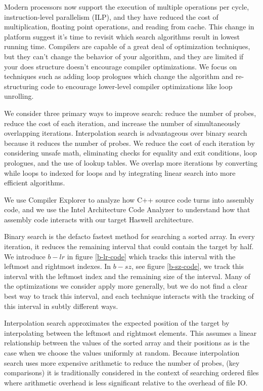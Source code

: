 \documentclass[twocolumn]{article}
\begin{document}
Modern processors now support the execution of multiple operations per cycle, instruction-level parallelism (ILP), and they have reduced the cost of multiplication, floating point operations, and reading from cache. This change in platform suggest it's time to revisit which search algorithms result in lowest running time. Compilers are capable of a great deal of optimization techniques, but they can't change the behavior of your algorithm, and they are limited if your does structure doesn't encourage compiler optimizations. We focus on techniques such as adding loop prologues which change the algorithm and re-structuring code to encourage lower-level compiler optimizations like loop unrolling.

We consider three primary ways to improve search: reduce the number of probes, reduce the cost of each iteration, and increase the number of simultaneously overlapping iterations. Interpolation search is advantageous over binary search because it reduces the number of probes. We reduce the cost of each iteration by considering unsafe math, eliminating checks for equality and exit conditions, loop prologues, and the use of lookup tables. We overlap more iterations by converting while loops to indexed for loops and by integrating linear search into more efficient algorithms.

We use Compiler Explorer to analyze how C++ source code turns into assembly code, and we use the Intel Architecture Code Analyzer to understand how that assembly code interacts with our target Haswell architecture.

Binary search is the defacto fastest method for searching a sorted array. In every iteration, it reduces the remaining interval that could contain the target by half. We introduce $b-lr$ in figure \ref{b-lr-code} which tracks this interval with the leftmost and rightmost indexes. In $b-sz$, see figure \ref{b-sz-code}, we track this interval with the leftmost index and the remaining size of the interval. Many of the optimizations we consider apply more generally, but we do not find a clear best way to track this interval, and each technique interacts with the tracking of this interval in subtly different ways. 

Interpolation search approximates the expected position of the target by interpolating between the leftmost and rightmost elements. This assumes a linear relationship between the values of the sorted array and their positions as is the case when we choose the values uniformly at random. Because interpolation search uses more expensive arithmetic to reduce the number of probes, (key comparisons) it is traditionally considered in the context of searching ordered files where arithmetic overhead is less significant relative to the overhead of file IO.
\end{document}
